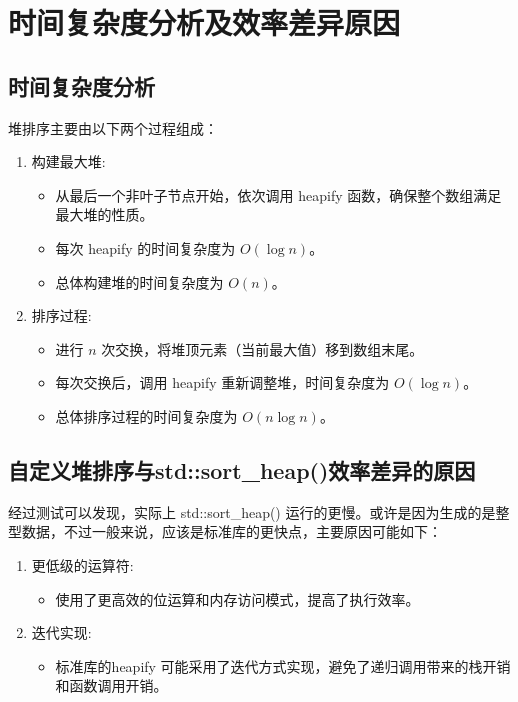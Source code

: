 \documentclass{article}
\begin{document}
\section{时间复杂度分析及效率差异原因}

\subsection{时间复杂度分析}

堆排序主要由以下两个过程组成：

\begin{enumerate}
    \item 构建最大堆:
    \begin{itemize}
        \item 从最后一个非叶子节点开始，依次调用 heapify 函数，确保整个数组满足最大堆的性质。
        \item 每次 heapify 的时间复杂度为 $O(\log n)$。
        \item 总体构建堆的时间复杂度为 $O(n)$。
    \end{itemize}

    \item 排序过程:
    \begin{itemize}
        \item 进行 $n$ 次交换，将堆顶元素（当前最大值）移到数组末尾。
        \item 每次交换后，调用 heapify 重新调整堆，时间复杂度为 $O(\log n)$。
        \item 总体排序过程的时间复杂度为 $O(n \log n)$。
    \end{itemize}
\end{enumerate}

\subsection{自定义堆排序与std::sort\_heap()效率差异的原因}

经过测试可以发现，实际上 std::sort\_heap() 运行的更慢。或许是因为生成的是整型数据，不过一般来说，应该是标准库的更快点，主要原因可能如下：

    \begin{enumerate}
        \item 更低级的运算符:
            \begin{itemize}
                \item 使用了更高效的位运算和内存访问模式，提高了执行效率。
            \end{itemize}

        \item 迭代实现:
        \begin{itemize}
            \item 标准库的heapify 可能采用了迭代方式实现，避免了递归调用带来的栈开销和函数调用开销。
        \end{itemize}
    \end{enumerate}
\end{document}
